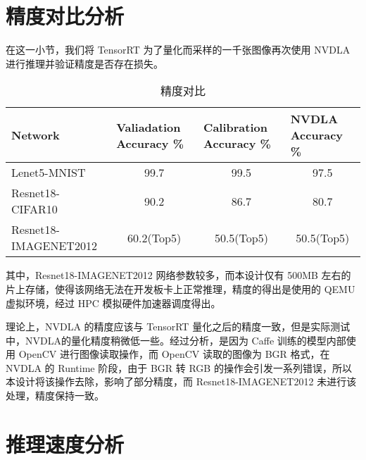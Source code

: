 \section{精度对比分析}

在这一小节，我们将 TensorRT 为了量化而采样的一千张图像再次使用 NVDLA 进行推理并验证精度是否存在损失。

\begin{table}[!htbp]
    \caption{精度对比}
    \label{tab:Qualifications Report}
    \centering
    \footnotesize%
    \setlength{\tabcolsep}{4pt}%
    \renewcommand{\arraystretch}{1.2}%
    \begin{tabular}{lccc}
        \toprule
        \textbf{Network}      & \multicolumn{1}{l}{\textbf{Valiadation Accuracy \%}} & \multicolumn{1}{l}{\textbf{Calibration Accuracy \%}}  & \multicolumn{1}{l}{\textbf{NVDLA Accuracy \%}} \\
        \midrule
        Lenet5-MNIST          & 99.7                                                 & 99.5                                                 & 97.5                                                 \\  
        Resnet18-CIFAR10      & 90.2                                                 & 86.7                                                 & 80.7                                                 \\
        Resnet18-IMAGENET2012 & 60.2(Top5)                                           & 50.5(Top5)                                           & 50.5(Top5)                                           \\
        \bottomrule                   
    \end{tabular}
\end{table}

其中，Resnet18-IMAGENET2012 网络参数较多，而本设计仅有 500MB 左右的片上存储，使得该网络无法在开发板卡上正常推理，精度的得出是使用的 QEMU 虚拟环境，经过 HPC 模拟硬件加速器调度得出。

理论上，NVDLA 的精度应该与 TensorRT 量化之后的精度一致，但是实际测试中，NVDLA的量化精度稍微低一些。经过分析，是因为 Caffe 训练的模型内部使用 OpenCV 进行图像读取操作，而 OpenCV 读取的图像为 BGR 格式，在 NVDLA 的 Runtime 阶段，由于 BGR 转 RGB 的操作会引发一系列错误，所以本设计将该操作去除，影响了部分精度，而 Resnet18-IMAGENET2012 未进行该处理，精度保持一致。

\section{推理速度分析}

